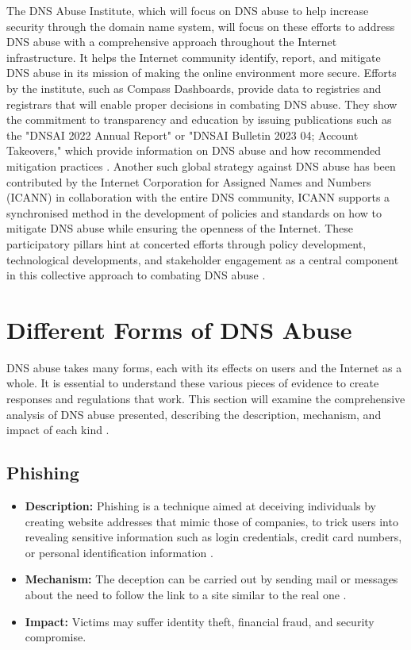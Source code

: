 The DNS Abuse Institute, which will focus on DNS abuse to help increase security through the domain name system, will focus on these efforts to address DNS abuse with a comprehensive approach throughout the Internet infrastructure. It helps the Internet community identify, report, and mitigate DNS abuse in its mission of making the online environment more secure. Efforts by the institute, such as Compass Dashboards, provide data to registries and registrars that will enable proper decisions in combating DNS abuse. They show the commitment to transparency and education by issuing publications such as the "DNSAI 2022 Annual Report" or "DNSAI Bulletin 2023 04; Account Takeovers," which provide information on DNS abuse and how recommended mitigation practices \cite{dnsabuseinstitute2023}. Another such global strategy against DNS abuse has been contributed by the Internet Corporation for Assigned Names and Numbers (ICANN) \cite{icann2022dnsabuse} in collaboration with the entire DNS community, ICANN supports a synchronised method in the development of policies and standards on how to mitigate DNS abuse while ensuring the openness of the Internet. These participatory pillars hint at concerted efforts through policy development, technological developments, and stakeholder engagement as a central component in this collective approach to combating DNS abuse \cite{dnsai2022report}. 



\section{Different Forms of DNS Abuse}

DNS abuse takes many forms, each with its effects on users and the Internet as a whole. It is essential to understand these various pieces of evidence to create responses and regulations that work. This section will examine the comprehensive analysis of DNS abuse presented, describing the description, mechanism, and impact of each kind \cite{dotmagazine2022dnsabuse}.

\subsection{Phishing}
\begin{itemize}
    \item \textbf{Description:} Phishing is a technique aimed at deceiving individuals by creating website addresses that mimic those of companies, to trick users into revealing sensitive information such as login credentials, credit card numbers, or personal identification information \cite{webinarcare2023dnsstats}.
    \item \textbf{Mechanism:} The deception can be carried out by sending mail or messages about the need to follow the link to a site similar to the real one \cite{jakobsson2006phishing}.
    \item \textbf{Impact:} Victims may suffer identity theft, financial fraud, and security compromise.
\end{itemize}

